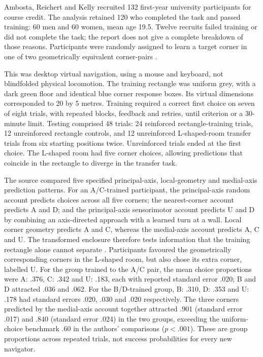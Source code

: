 Ambosta, Reichert and Kelly recruited 132 first-year university
participants for course credit. The analysis retained 120 who
completed the task and passed training: 60 men and 60 women, mean
age 19.5. Twelve recruits failed training or did not complete the
task; the report does not give a complete breakdown of those
reasons. Participants were randomly assigned to learn a target
corner in one of two geometrically equivalent corner-pairs
\cite[Participants and Procedure]{AmbostaEtAl2013ReorientationSPU}.

This was desktop virtual navigation, using a mouse and keyboard,
not blindfolded physical locomotion. The training rectangle was
uniform grey, with a dark green floor and identical blue corner
response boxes. Its virtual dimensions corresponded to 20 by
5 metres. Training required a correct first choice on seven of
eight trials, with repeated blocks, feedback and retries, until
criterion or a 30-minute limit.
Testing comprised 48 trials: 24 reinforced rectangle-training
trials, 12 unreinforced rectangle controls, and 12 unreinforced
L-shaped-room transfer trials from six starting positions twice.
Unreinforced trials ended at the first choice.
The L-shaped room had five corner choices, allowing predictions
that coincide in the rectangle to diverge in the transfer task.

The source compared five specified principal-axis, local-geometry
and medial-axis prediction patterns. For an A/C-trained participant,
the principal-axis random account predicts choices across all five
corners; the nearest-corner account predicts A and D; and the
principal-axis sensorimotor account predicts U and D by combining an
axis-directed approach with a learned turn at a wall.
Local corner geometry predicts A and C, whereas the medial-axis
account predicts A, C and U. The transformed enclosure therefore
tests information that the training rectangle alone cannot separate
\cite[Fig.\ 2]{AmbostaEtAl2013ReorientationSPU}.
Participants favoured the
geometrically corresponding corners in the L-shaped room, but also
chose its extra corner, labelled U.
For the group trained to the A/C pair, the mean choice proportions
were A: .376, C: .342 and U: .183, each with reported standard error
.020; B and D attracted .036 and .062.
For the B/D-trained group, B: .310, D: .353 and U: .178
had standard errors .020, .030 and .020 respectively.
The three corners predicted by the medial-axis account together
attracted .901 (standard error .017) and .840 (standard error .024)
in the two groups, exceeding the uniform-choice benchmark .60
in the authors' comparisons (\(p<.001\)).
These are group proportions across repeated trials, not success
probabilities for every new navigator.

